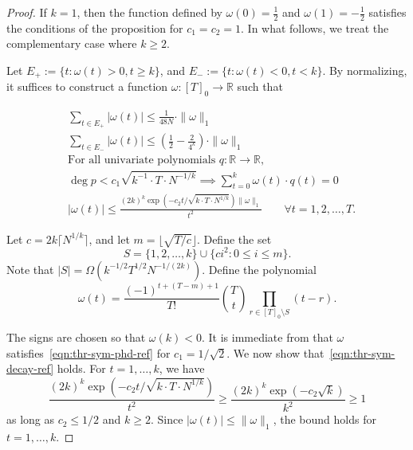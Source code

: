 \documentclass[11pt, letterpaper, fleqn]{article}
\theoremstyle{plain}
\newcommand{\R}{\mathbb{R}}
\begin{document}
\begin{proof}
If $k = 1$, then the function defined by $\omega(0) = \frac{1}{2}$ and $\omega(1) = -\frac{1}{2}$ satisfies the conditions of the proposition for $c_1 = c_2 = 1$. In what follows, we treat the complementary case where $k \ge 2$.

Let $E_+ := \{t \colon \omega(t) > 0, t \ge k\}$, and $E_{-} := \{t\colon \omega(t) < 0, t < k\}$. 
By normalizing, it suffices to construct a function $\omega : [T]_0 \to \R$ such that

\begin{align} & \sum_{t \in E_+} |\omega(t)| \le \frac{1}{48 N} \cdot \|\omega\|_1  \label{eqn:thr-sym-pos-corr-ref} \\
& \sum_{t \in E_-} |\omega(t)| \le \left(\frac{1}{2} - \frac{2}{4^k}\right) \cdot \|\omega\|_1  \label{eqn:thr-sym-neg-corr-ref} \\
& \text{For all univariate polynomials } q \colon \R \to \R\text{, } \nonumber \\
&\deg p < c_1\sqrt{k^{-1} \cdot T \cdot N^{-1/k}} \implies \sum_{t=0}^k \omega(t) \cdot q(t) = 0 \label{eqn:thr-sym-phd-ref} \\
&  |\omega(t)| \le \frac{(2k)^k \exp(-c_2 t / \sqrt{k \cdot T \cdot N^{1/k}})\|\omega\|_1}{t^2} \qquad \forall t = 1, 2, \dots, T.\label{eqn:thr-sym-decay-ref}
\end{align}

Let $c = 2k\lceil N^{1/k}\rceil$, and let $m = \lfloor \sqrt{T/c} \rfloor$. 
Define the set
\[S = \{1, 2, \dots, k\} \cup \{ci^2 : 0 \le i \le m\}.\]
Note that $|S| = \Omega(k^{-1/2}T^{1/2}N^{-1/(2k)})$. Define the polynomial
\[\omega(t) = \frac{(-1)^{t+(T-m)+1}}{T!} \binom{T}{t} \prod_{r \in [T]_0 \setminus S} (t - r).\]

The signs are chosen so that $\omega(k) < 0$. 
 It is immediate from  that $\omega$ satisfies~\eqref{eqn:thr-sym-phd-ref} for $c_1 = 1/\sqrt{2}$.
We now show that~\eqref{eqn:thr-sym-decay-ref} holds. For $t = 1, \dots, k$, we have
\[\frac{(2k)^k \exp(-c_2 t / \sqrt{k \cdot T \cdot N^{1/k}})}{t^2} \ge \frac{(2k)^k \exp(-c_2 \sqrt{k})}{k^2} \ge 1\]
as long as $c_2 \le 1/2$ and $k \ge 2$. Since $|\omega(t)| \le \|\omega\|_1$, the bound holds for $t = 1, \dots, k$.



\end{proof}
\end{document}
